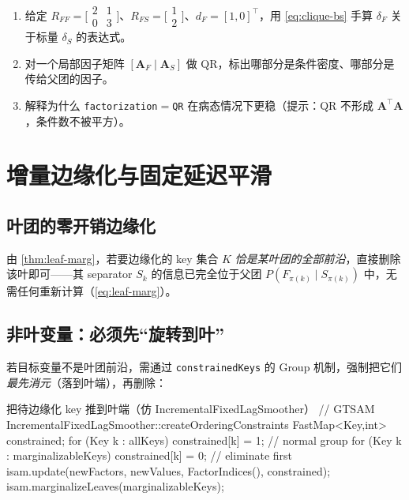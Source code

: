\begin{practice}
\begin{enumerate}
  \item 给定 $R_{FF}=\big[\begin{smallmatrix}2&1\\0&3\end{smallmatrix}\big]$、$R_{FS}=\big[\begin{smallmatrix}1\\2\end{smallmatrix}\big]$、$d_F=[1,0]^\top$，用 \cref{eq:clique-bs} 手算 $\delta_F$ 关于标量 $\delta_S$ 的表达式。
  \item 对一个局部因子矩阵 $[\mathbf{A}_F\mid\mathbf{A}_S]$ 做 QR，标出哪部分是条件密度、哪部分是传给父团的因子。
  \item 解释为什么 \texttt{factorization}$=$\texttt{QR} 在病态情况下更稳（提示：QR 不形成 $\mathbf{A}^\top\mathbf{A}$，条件数不被平方）。
\end{enumerate}
\end{practice}

\section{增量边缘化与固定延迟平滑}
\label{sec:isam-marg}

\subsection{叶团的零开销边缘化}
\label{sec:isam-leaf-marg}

由 \cref{thm:leaf-marg}，若要边缘化的 key 集合 $K$ \emph{恰是某叶团的全部前沿}，直接删除该叶即可——其 separator $S_k$ 的信息已完全位于父团 $P(F_{\pi(k)}\mid S_{\pi(k)})$ 中，无需任何重新计算（\cref{eq:leaf-marg}）。

\subsection{非叶变量：必须先“旋转到叶”}
\label{sec:isam-rotate-to-leaf}

若目标变量不是叶团前沿，需通过 \texttt{constrainedKeys} 的 Group 机制，强制把它们\emph{最先消元}（落到叶端），再删除：

\begin{codebox}[C++]{把待边缘化 key 推到叶端（仿 IncrementalFixedLagSmoother）}
// GTSAM IncrementalFixedLagSmoother::createOrderingConstraints
FastMap<Key,int> constrained;
for (Key k : allKeys)            constrained[k] = 1;  // normal group
for (Key k : marginalizableKeys) constrained[k] = 0;  // eliminate first
isam.update(newFactors, newValues, FactorIndices(), constrained);
isam.marginalizeLeaves(marginalizableKeys);
\end{codebox}

